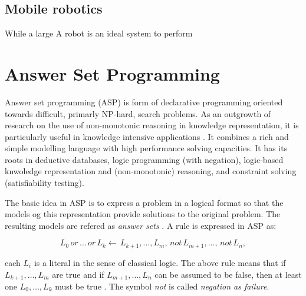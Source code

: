 



\subsection{Mobile robotics}
While a large A robot is an ideal system to perform 






\section{Answer Set Programming} %

Answer set programming (ASP) is form of declarative programming oriented towards difficult, primarly NP-hard, search problems.
As an outgrowth of research on the use of non-monotonic reasoning in knowledge representation, it is particularly useful in knowledge intensive applications \citep{Lifschitz2008_WhatASP}. 
It combines a rich and simple modelling language with high performance solving capacities. 
It has its roots in deductive databases, logic programming (with negation), logic-based knwoledge representation and (non-monotonic) reasoning, and constraint solving (satisfiability testing).

The basic idea in ASP is to express a problem in a logical format so that the models og this representation provide solutions to the original problem. The resulting models are refered as \textit{answer sets} \citep{Gebser2013_ASP}. A rule is expressed in ASP as:

\begin{equation*}
L_{0} \, \textit{or} \, \dots \, \textit{or} \, L_{k} \longleftarrow \, L_{k+1} , \ldots , L_{m} , \, \textit{not} \, L_{m+1} , \ldots , \, \textit{not} \, L_{n},
\end{equation*}

each $L_{i}$ is a literal in the sense of classical logic. The above rule means that if $L_{k+1},\ldots,L_{m}$ are true and if $L_{m+1},\ldots,L_{n}$ can be assumed to be false, then at least one $L_{0},\ldots,L_{k}$ must be true \citep{Gelf88a}. The symbol \textit{not} is called \textit{negation as failure}.

